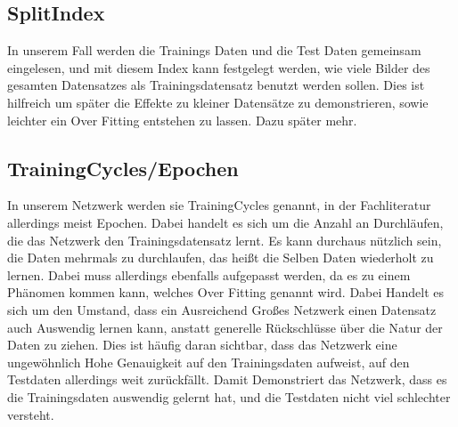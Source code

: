 \documentclass[12pt]{article}
\begin{document}
\subsection{SplitIndex}
In unserem Fall werden die Trainings Daten und die Test Daten gemeinsam eingelesen, und mit diesem Index kann festgelegt werden, wie viele Bilder des gesamten Datensatzes als Trainingsdatensatz benutzt werden sollen. Dies ist hilfreich um später die Effekte zu kleiner Datensätze zu demonstrieren, sowie leichter ein Over Fitting entstehen zu lassen. Dazu später mehr.
\subsection{TrainingCycles/Epochen}
In unserem Netzwerk werden sie TrainingCycles genannt, in der Fachliteratur allerdings meist Epochen. Dabei handelt es sich um die Anzahl an Durchläufen, die das Netzwerk den Trainingsdatensatz lernt. Es kann durchaus nützlich sein, die Daten mehrmals zu durchlaufen, das heißt die Selben Daten wiederholt zu lernen. Dabei muss allerdings ebenfalls aufgepasst werden, da es zu einem Phänomen kommen kann, welches Over Fitting genannt wird. Dabei Handelt es sich um den Umstand, dass ein Ausreichend Großes Netzwerk einen Datensatz auch Auswendig lernen kann, anstatt generelle Rückschlüsse über die Natur der Daten zu ziehen. Dies ist häufig daran sichtbar, dass das Netzwerk eine ungewöhnlich Hohe Genauigkeit auf den Trainingsdaten aufweist, auf den Testdaten allerdings weit zurückfällt. Damit Demonstriert das Netzwerk, dass es die Trainingsdaten auswendig gelernt hat, und die Testdaten nicht viel schlechter versteht. 
\end{document}
